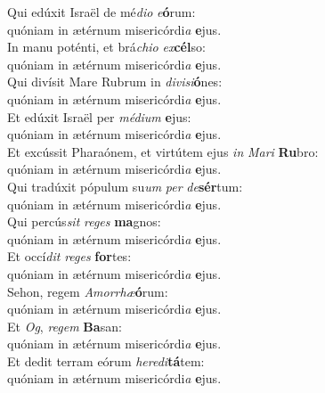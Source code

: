 \evenverse Qui edúxit Israël de mé\textit{di}\textit{o} \textit{e}\textbf{ó}rum:~\*\\
\evenverse quóniam in ætérnum misericórdi\textit{a} \textbf{e}jus.\\
\oddverse In manu poténti, et brá\textit{chi}\textit{o} \textit{ex}\textbf{cél}so:~\*\\
\oddverse quóniam in ætérnum misericórdi\textit{a} \textbf{e}jus.\\
\evenverse Qui divísit Mare Rubrum in \textit{di}\textit{vi}\textit{si}\textbf{ó}nes:~\*\\
\evenverse quóniam in ætérnum misericórdi\textit{a} \textbf{e}jus.\\
\oddverse Et edúxit Israël per \textit{mé}\textit{di}\textit{um} \textbf{e}jus:~\*\\
\oddverse quóniam in ætérnum misericórdi\textit{a} \textbf{e}jus.\\
\evenverse Et excússit Pharaónem, et virtútem ejus \textit{in} \textit{Ma}\textit{ri} \textbf{Ru}bro:~\*\\
\evenverse quóniam in ætérnum misericórdi\textit{a} \textbf{e}jus.\\
\oddverse Qui tradúxit pópulum su\textit{um} \textit{per} \textit{de}\textbf{sér}tum:~\*\\
\oddverse quóniam in ætérnum misericórdi\textit{a} \textbf{e}jus.\\
\evenverse Qui percús\textit{sit} \textit{re}\textit{ges} \textbf{ma}gnos:~\*\\
\evenverse quóniam in ætérnum misericórdi\textit{a} \textbf{e}jus.\\
\oddverse Et occí\textit{dit} \textit{re}\textit{ges} \textbf{for}tes:~\*\\
\oddverse quóniam in ætérnum misericórdi\textit{a} \textbf{e}jus.\\
\evenverse Sehon, regem \textit{A}\textit{mor}\textit{rhæ}\textbf{ó}rum:~\*\\
\evenverse quóniam in ætérnum misericórdi\textit{a} \textbf{e}jus.\\
\oddverse Et \textit{Og}, \textit{re}\textit{gem} \textbf{Ba}san:~\*\\
\oddverse quóniam in ætérnum misericórdi\textit{a} \textbf{e}jus.\\
\evenverse Et dedit terram eórum \textit{he}\textit{re}\textit{di}\textbf{tá}tem:~\*\\
\evenverse quóniam in ætérnum misericórdi\textit{a} \textbf{e}jus.\\
